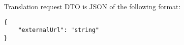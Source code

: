 \documentclass[../main.tex]{subfiles}
\begin{document}
Translation request DTO is JSON of the following format:
\begin{lstlisting}[numbers=none, caption=Format of translation request DTO, label={lst:TranslationRequest}]
{
    "externalUrl": "string"
}
\end{lstlisting}
\end{document}
